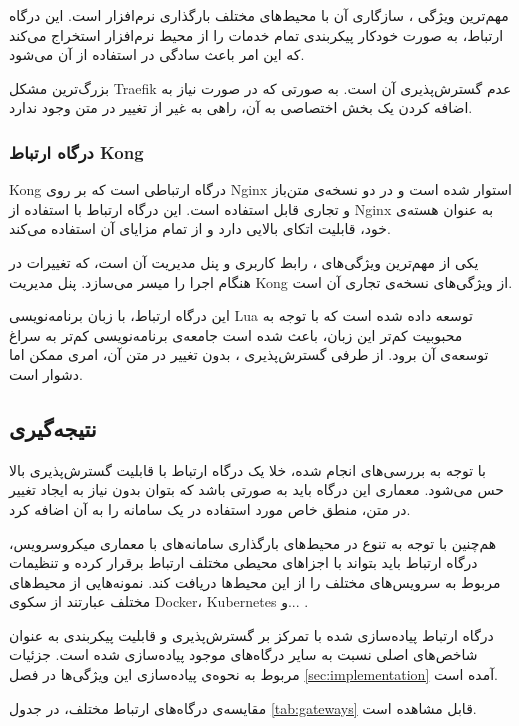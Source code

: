 مهم‌ترین ویژگی ، سازگاری آن با محیط‌های مختلف بارگذاری نرم‌افزار است. این درگاه ارتباط، به صورت خودکار پیکربندی تمام خدمات را از محیط نرم‌افزار استخراج می‌کند که این امر باعث سادگی در استفاده از آن می‌شود.

بزرگ‌ترین مشکل Traefik عدم گسترش‌پذیری آن است. به صورتی که در صورت نیاز به اضافه کردن یک بخش اختصاصی به آن، راهی به غیر از تغییر در متن وجود ندارد.

\subsubsection{درگاه ارتباط Kong}
Kong درگاه ارتباطی است که بر روی Nginx استوار شده است و در دو نسخه‌ی متن‌باز و تجاری قابل استفاده است. این درگاه ارتباط با استفاده از Nginx به عنوان هسته‌ی خود، قابلیت اتکای بالایی دارد و از تمام مزایای آن استفاده می‌کند.

یکی از مهم‌ترین ویژگی‌های ، رابط کاربری و پنل مدیریت آن است، که تغییرات در هنگام اجرا را میسر می‌سازد. پنل مدیریت Kong از ویژگی‌های نسخه‌ی
تجاری آن است.

این درگاه ارتباط،‌ با زبان برنامه‌نویسی Lua توسعه داده شده است که با توجه به محبوبیت کم‌تر این زبان، باعث شده‌ است جامعه‌ی برنامه‌نویسی کم‌تر به سراغ توسعه‌ی آن برود. از طرفی گسترش‌پذیری ، بدون تغییر در متن آن، امری ممکن اما دشوار است.

\subsection{نتیجه‌گیری}\label{subsec:sources_results}
با توجه به بررسی‌های انجام شده،‌ خلا یک درگاه ارتباط با قابلیت گسترش‌پذیری بالا حس می‌شود. معماری این درگاه باید به صورتی باشد که بتوان بدون نیاز به ایجاد تغییر در متن، منطق خاص مورد استفاده در یک سامانه را به آن اضافه کرد.

هم‌چنین با توجه به تنوع در محیط‌های بارگذاری سامانه‌های با معماری میکروسرویس، درگاه ارتباط باید بتواند با اجزاهای محیطی مختلف ارتباط برقرار کرده و تنظیمات مربوط به سرویس‌های مختلف را از این محیط‌ها دریافت کند. نمونه‌هایی از محیط‌های مختلف عبارتند از سکوی Docker، Kubernetes و... .

درگاه ارتباط پیاده‌سازی شده با تمرکز بر گسترش‌پذیری و قابلیت پیکربندی به عنوان شاخص‌های اصلی نسبت به سایر درگاه‌های موجود پیاده‌سازی شده است. جزئیات مربوط به نحوه‌ی پیاده‌سازی این ویژگی‌ها در فصل
\ref{sec:implementation}
آمده است.

مقایسه‌ی درگاه‌های ارتباط مختلف، در جدول
\ref{tab:gateways}
قابل مشاهده است.


